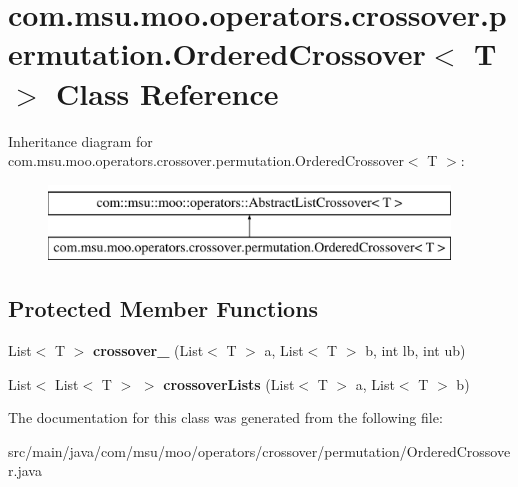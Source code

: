 \hypertarget{classcom_1_1msu_1_1moo_1_1operators_1_1crossover_1_1permutation_1_1OrderedCrossover_3_01T_01_4}{\section{com.\-msu.\-moo.\-operators.\-crossover.\-permutation.\-Ordered\-Crossover$<$ T $>$ Class Reference}
\label{classcom_1_1msu_1_1moo_1_1operators_1_1crossover_1_1permutation_1_1OrderedCrossover_3_01T_01_4}
}
Inheritance diagram for com.\-msu.\-moo.\-operators.\-crossover.\-permutation.\-Ordered\-Crossover$<$ T $>$\-:\begin{figure}[H]
\begin{center}
\leavevmode
\includegraphics[height=2.000000cm]{classcom_1_1msu_1_1moo_1_1operators_1_1crossover_1_1permutation_1_1OrderedCrossover_3_01T_01_4}
\end{center}
\end{figure}
\subsection*{Protected Member Functions}
\begin{DoxyCompactItemize}
\item 
\hypertarget{classcom_1_1msu_1_1moo_1_1operators_1_1crossover_1_1permutation_1_1OrderedCrossover_3_01T_01_4_a1969cf216880631b581718a1c622f165}{List$<$ T $>$ {\bfseries crossover\-\_\-} (List$<$ T $>$ a, List$<$ T $>$ b, int lb, int ub)}\label{classcom_1_1msu_1_1moo_1_1operators_1_1crossover_1_1permutation_1_1OrderedCrossover_3_01T_01_4_a1969cf216880631b581718a1c622f165}

\item 
\hypertarget{classcom_1_1msu_1_1moo_1_1operators_1_1crossover_1_1permutation_1_1OrderedCrossover_3_01T_01_4_a2d2aa71c9ad0f559409a2fca60ded0b6}{List$<$ List$<$ T $>$ $>$ {\bfseries crossover\-Lists} (List$<$ T $>$ a, List$<$ T $>$ b)}\label{classcom_1_1msu_1_1moo_1_1operators_1_1crossover_1_1permutation_1_1OrderedCrossover_3_01T_01_4_a2d2aa71c9ad0f559409a2fca60ded0b6}

\end{DoxyCompactItemize}


The documentation for this class was generated from the following file\-:\begin{DoxyCompactItemize}
\item 
src/main/java/com/msu/moo/operators/crossover/permutation/Ordered\-Crossover.\-java\end{DoxyCompactItemize}
